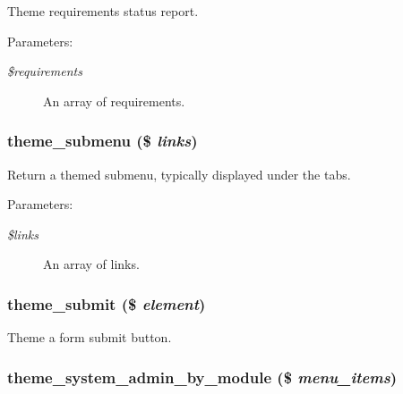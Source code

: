 Theme requirements status report.

\begin{Desc}
\item[Parameters:]
\begin{description}
\item[{\em \$requirements}]An array of requirements. \end{description}
\end{Desc}
\hypertarget{group__themeable_g9967b5f542549c520851500eb25c4ffe}{
\subsubsection[{theme\_\-submenu}]{\setlength{\rightskip}{0pt plus 5cm}theme\_\-submenu (\$ {\em links})}}
\label{group__themeable_g9967b5f542549c520851500eb25c4ffe}


Return a themed submenu, typically displayed under the tabs.

\begin{Desc}
\item[Parameters:]
\begin{description}
\item[{\em \$links}]An array of links. \end{description}
\end{Desc}
\hypertarget{group__themeable_g72d55d80f4f8ca2793330dd9cde4ea61}{
\subsubsection[{theme\_\-submit}]{\setlength{\rightskip}{0pt plus 5cm}theme\_\-submit (\$ {\em element})}}
\label{group__themeable_g72d55d80f4f8ca2793330dd9cde4ea61}


Theme a form submit button. \hypertarget{group__themeable_gf89acb33020a2b0dd55d410ce725ecb8}{
\subsubsection[{theme\_\-system\_\-admin\_\-by\_\-module}]{\setlength{\rightskip}{0pt plus 5cm}theme\_\-system\_\-admin\_\-by\_\-module (\$ {\em menu\_\-items})}}
\label{group__themeable_gf89acb33020a2b0dd55d410ce725ecb8}


